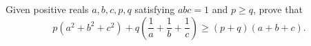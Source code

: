 Given positive reals $a,b,c,p,q$ satisfying $abc=1$ and $p \geq q$, prove that \[ p \left(a^2+b^2+c^2\right) + q\left( \frac{1}{a} + \frac{1}{b} + \frac{1}{c}\right) \geq (p+q) (a+b+c). \]